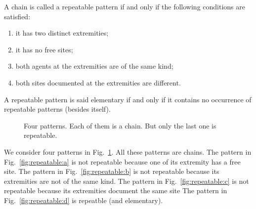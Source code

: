 \documentclass{entcs}
\begin{document}
\begin{defn}
A chain is called a repeatable pattern if and only if the following conditions are satisfied:
\begin{enumerate}
\item it has two distinct extremities;
\item it has no free sites;
\item both agents at the extremities are of the same kind;
\item both sites documented at the extremities are different.
\end{enumerate}
A repeatable pattern is said elementary if and only if it contains no occurrence of repeatable patterns (besides itself).
\end{defn}

\begin{figure}[t]
%
%

%
\caption{Four patterns. Each of them is a chain. But only the last one is repeatable.}
\label{fig:repeatable}
\end{figure}

\begin{exmp}
  We consider four patterns in Fig.~\ref{fig:repeatable}.
  All these patterns are chains.
  The pattern in Fig.~\ref{fig:repeatable:a} is not repeatable because one of its extremity has a free site.
  The pattern in Fig.~\ref{fig:repeatable:b} is not repeatable
  because its extremities are not of the same kind.
  The pattern in Fig.~\ref{fig:repeatable:c} is not repeatable
  because its extremities document the same site
  The pattern in Fig.~\ref{fig:repeatable:d} is repeatble (and elementary).
\end{exmp}
\end{document}

